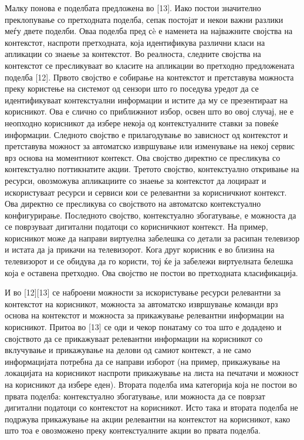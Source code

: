 Малку понова е поделбата предложена во [13]. Иако постои значително преклопување
со претходната поделба, сепак постојат и некои важни разлики меѓу двете поделби.
Оваа поделба пред сè е наменета на најважните својства на контекстот, наспроти
претходната, која идентификува различни класи на апликации со знаење за
контекстот. Во реалноста, следните својства на контекстот се пресликуваат во
класите на апликации во претходно предложената поделба [12]. Првото својство е
собирање на контекстот и претставува можноста преку користење на системот од
сензори што го поседува уредот да се идентификуваат контекстуални информации и
истите да му се презентираат на корисникот. Ова е слично со приближниот избор,
освен што во овој случај, не е неопходно корисникот да избере некоја од
контекстуалните ставки за повеќе информации. Следното својство е прилагодување
во зависност од контекстот и претставува можност за автоматско извршување или
изменување на некој сервис врз основа на моментниот контекст. Ова својство
директно се пресликува со контекстуално поттикнатите акции. Третото својство,
контекстуално откривање на ресурси, овозможува апликациите со знаење за
контекстот да лоцираат и искористуваат ресурси и сервиси кои се релевантни за
корисничкиот контекст. Ова директно се пресликува со својството на автоматско
контекстуално конфигурирање. Последното својство, контекстуално збогатување, е
можноста да се поврзуваат дигитални податоци со корисничкиот контекст. На
пример, корисникот може да направи виртуелна забелешка со детали за расипан
телевизор и истата да ја прикачи на телевизорот. Кога друг корисник е во близина
на телевизорот и се обидува да го користи, тој ќе ја забележи виртуелната
белешка која е оставена претходно. Ова својство не постои во претходната
класификација.

И во [12][13] се наброени можности за искористување ресурси релевантни за
контекстот на корисникот, можноста за автоматско извршување команди врз основа
на контекстот и можноста за прикажување релевантни информации на корисникот.
Притоа во [13] се оди и чекор понатаму со тоа што е додадено и својството да се
прикажуваат релевантни информации на корисникот со вклучување и прикажување на
делови од самиот контекст, а не само информацијата потребна да се направи
изборот (на пример, прикажување на локацијата на корисникот наспроти прикажување
на листа на печатачи и можност на корисникот да избере еден). Втората поделба
има категорија која не постои во првата поделба: контекстуално збогатување, или
можноста да се поврзат дигитални податоци со контекстот на корисникот. Исто така
и втората поделба не подржува прикажување на акции релевантни на контекстот на
корисникот, како што тоа е овозможено преку контекстуалните акции во првата
поделба.

